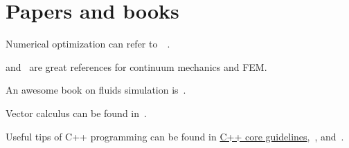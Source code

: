 \documentclass{fancydoc}
\begin{document}
\section{Papers and books}

Numerical optimization can refer to~\cite{boyd2004convex}~\cite{nocedal2006numerical}.

\cite{bonet1997nonlinear} and~\cite{sifakis2012fem} are great references for continuum mechanics and FEM.

An awesome book on fluids simulation is~\cite{bridson2015fluid}.

Vector calculus can be found in~\cite{petersen2008matrix}.

Useful tips of C++ programming can be found in \href{https://github.com/isocpp/CppCoreGuidelines}{C++ core guidelines},~\cite{meyers2005effective}, and~\cite{meyers2014effective}.


 
\end{document}
